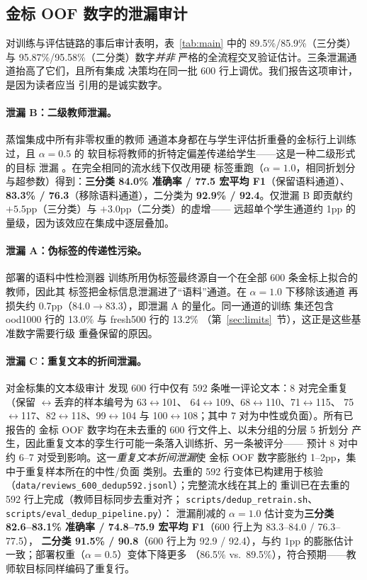 \documentclass[11pt,a4paper]{article}
\newcommand{\code}[1]{\texttt{#1}}
\begin{document}
\subsection{金标 OOF 数字的泄漏审计}
\label{sec:leakage}

对训练与评估链路的事后审计表明，表~\ref{tab:main} 中的
89.5\%/85.9\%（三分类）与 95.87\%/95.58\%（二分类）数字\emph{并非}
严格的全流程交叉验证估计。三条泄漏通道抬高了它们，且所有集成
决策均在同一批 600 行上调优。我们报告这项审计，是因为读者应当
引用的是诚实数字。

\paragraph{泄漏 B：二级教师泄漏。} 蒸馏集成中所有非零权重的教师
通道本身都在与学生评估折重叠的金标行上训练过，且 $\alpha=0.5$ 的
软目标将教师的折特定偏差传递给学生——这是一种二级形式的目标
泄漏 \citep{kapoor2023,sainz2023}。在完全相同的流水线下仅改用硬
标签重跑（$\alpha=1.0$，相同折划分与超参数）得到：\textbf{三分类
84.0\% 准确率 / 77.5 宏平均 F1}（保留语料通道）、\textbf{83.3\% /
76.3}（移除语料通道），二分类为 \textbf{92.9\% / 92.4}。仅泄漏 B
即贡献约 $+5.5$pp（三分类）与 $+3.0$pp（二分类）的虚增——
远超单个学生通道约 1pp 的量级，因为该效应在集成中逐层叠加。

\paragraph{泄漏 A：伪标签的传递性污染。} 部署的语料中性检测器
训练所用伪标签最终源自一个在全部 600 条金标上拟合的教师，因此其
标签把金标信息泄漏进了“语料”通道。在 $\alpha=1.0$ 下移除该通道
再损失约 0.7pp（84.0$\to$83.3），即泄漏 A 的量化。同一通道的训练
集还包含 ood1000 行的 13.0\% 与 fresh500 行的 13.2\%
（第~\ref{sec:limits}~节），这正是这些基准数字需要行级
重叠保留的原因。

\paragraph{泄漏 C：重复文本的折间泄漏。} 对金标集的文本级审计
发现 600 行中仅有 592 条唯一评论文本：8 对完全重复（保留
$\leftrightarrow$丢弃的样本编号为 63$\leftrightarrow$101、
64$\leftrightarrow$109、68$\leftrightarrow$110、71$\leftrightarrow$115、
75$\leftrightarrow$117、82$\leftrightarrow$118、99$\leftrightarrow$104
与 100$\leftrightarrow$108；其中 7 对为中性或负面）。所有已报告的
金标 OOF 数字均在未去重的 600 行文件上、以未分组的分层 5 折划分
产生，因此重复文本的孪生行可能一条落入训练折、另一条被评分——
预计 8 对中约 6--7 对受到影响。这一\emph{重复文本折间泄漏}使
金标 OOF 数字膨胀约 1--2pp，集中于重复样本所在的中性/负面
类别。去重的 592 行变体已构建用于核验
（\code{data/reviews\_600\_dedup592.jsonl}）；完整流水线在其上的
重训已在去重的 592 行上完成（教师目标同步去重对齐；
\code{scripts/dedup\_retrain.sh}、\code{scripts/eval\_dedup\_pipeline.py}）：
泄漏削减的 $\alpha{=}1.0$ 估计变为\textbf{三分类 82.6--83.1\%
准确率 / 74.8--75.9 宏平均 F1}（600 行上为 83.3--84.0 / 76.3--77.5），
\textbf{二分类 91.5\% / 90.8}（600 行上为 92.9 / 92.4），与约 1pp
的膨胀估计一致；部署权重（$\alpha{=}0.5$）变体下降更多
（86.5\% vs.\ 89.5\%），符合预期——教师软目标同样编码了重复行。
\end{document}
